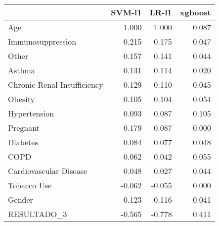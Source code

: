 \begin{tabular}{lrrr}
\toprule
{} &  SVM-l1 &  LR-l1 &  xgboost \\
\midrule
Age                         &   1.000 &  1.000 &    0.087 \\
Immunosuppression           &   0.215 &  0.175 &    0.047 \\
Other                       &   0.157 &  0.141 &    0.044 \\
Asthma                      &   0.131 &  0.114 &    0.020 \\
Chronic Renal Insufficiency &   0.129 &  0.110 &    0.045 \\
Obesity                     &   0.105 &  0.104 &    0.054 \\
Hypertension                &   0.093 &  0.087 &    0.105 \\
Pregnant                    &   0.179 &  0.087 &    0.000 \\
Diabetes                    &   0.084 &  0.077 &    0.048 \\
COPD                        &   0.062 &  0.042 &    0.055 \\
Cardiovascular Disease      &   0.048 &  0.027 &    0.044 \\
Tobacco Use                 &  -0.062 & -0.055 &    0.000 \\
Gender                      &  -0.123 & -0.116 &    0.041 \\
RESULTADO\_3                 &  -0.565 & -0.778 &    0.411 \\
\bottomrule
\end{tabular}
